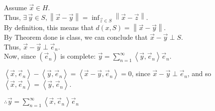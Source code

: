 \documentclass[letterpaper,12pt,fleqn]{article}
\newcommand{\ve}{\vec{e}}
\newcommand{\vx}{\vec{x}}
\newcommand{\vy}{\vec{y}}
\newcommand{\vz}{\vec{z}}
\newcommand{\inner}[1]{\left<#1\right>}
\newcommand{\norm}[1]{\left\|#1\right\|}
\begin{document}
Assume $\vx\in H$. \\
Thus, $\exists\,\vy\in S,\norm{\vx-\vy}=\inf_{\vz\in S}\norm{\vx-\vz}$. \\
By definition, this means that $d(x,S)=\norm{\vx-\vy}$. \\
By Theorem done is class, we can conclude that $\vx-\vy\perp S$. \\
Thus, $\vx-\vy\perp\ve_n$. \\
Now, since $(\ve_n)$ is complete:
$\vy=\sum_{n=1}^{\infty}\inner{\vy,\ve_n}\ve_n$.

$\inner{\vx,\ve_n}-\inner{\vy,\ve_n}=\inner{\vx-\vy,\ve_n}=0$, since
${\vx-\vy\perp\ve_n}$, and so $\inner{\vx,\ve_n}=\inner{\vy,\ve_n}$.

$\therefore\vy=\sum_{n=1}^{\infty}\inner{\vx,\ve_n}\ve_n$
\end{document}
